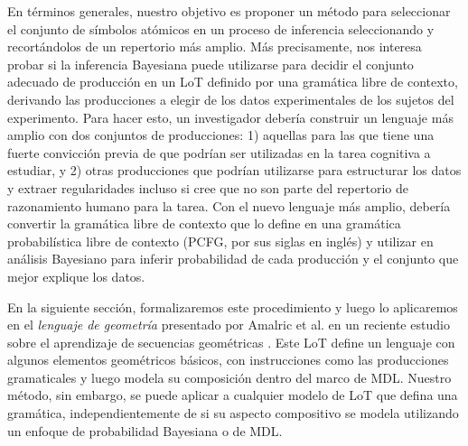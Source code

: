 En términos generales, nuestro objetivo es proponer un método para seleccionar el conjunto de símbolos atómicos en un proceso de inferencia seleccionando y recortándolos de un repertorio más amplio. Más precisamente, nos interesa probar si la inferencia Bayesiana puede utilizarse para decidir el conjunto adecuado de producción en un LoT definido por una gramática libre de contexto, derivando las producciones a elegir de los datos experimentales de los sujetos del experimento. Para hacer esto, un investigador debería construir un lenguaje más amplio con dos conjuntos de producciones: 1) aquellas para las que tiene una fuerte convicción previa de que podrían ser utilizadas en la tarea cognitiva a estudiar, y 2) otras producciones que podrían utilizarse para estructurar los datos y extraer regularidades incluso si cree que no son parte del repertorio de razonamiento humano para la tarea. Con el nuevo lenguaje más amplio, debería convertir la gramática libre de contexto que lo define en una gramática probabilística libre de contexto (PCFG, por sus siglas en inglés) y utilizar en análisis Bayesiano para inferir probabilidad de cada producción y el conjunto que mejor explique los datos.


En la siguiente sección, formalizaremos este procedimiento y luego lo aplicaremos en el \textit{lenguaje de geometría} presentado por Amalric et al. en un reciente estudio sobre el aprendizaje de secuencias geométricas \cite{amalric2017language}. Este LoT define un lenguaje con algunos elementos geométricos básicos, con instrucciones como las producciones gramaticales y luego modela su composición dentro del marco de MDL. Nuestro método, sin embargo, se puede aplicar a cualquier modelo de LoT que defina una gramática, independientemente de si su aspecto compositivo se modela utilizando un enfoque de probabilidad Bayesiana o de MDL.



